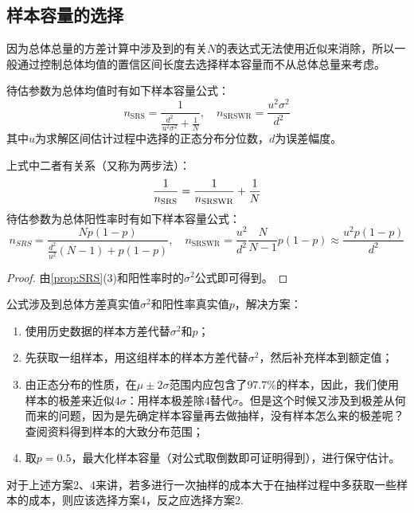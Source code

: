 \subsection{样本容量的选择}
\begin{note}
	因为总体总量的方差计算中涉及到的有关$N$的表达式无法使用近似来消除，所以一般通过控制总体均值的置信区间长度去选择样本容量而不从总体总量来考虑。
\end{note}
\begin{theorem}
	待估参数为总体均值时有如下样本容量公式：
	\begin{equation*}
		n_{\text{SRS}}=\frac{1}{\frac{d^2}{u^2\sigma^2}+\frac{1}{N}},\quad n_{\text{SRSWR}}=\frac{u^2\sigma^2}{d^2}
	\end{equation*}
	其中$u$为求解区间估计过程中选择的正态分布分位数，$d$为误差幅度。\par
	上式中二者有关系（又称为两步法）：
	\begin{equation}
		\frac{1}{n_{\text{SRS}}}=\frac{1}{n_{\text{SRSWR}}}+\frac{1}{N}\notag
	\end{equation}
	待估参数为总体阳性率时有如下样本容量公式：
	\begin{equation*}
		n_{SRS}=\frac{Np(1-p)}{\frac{d^2}{u^2}(N-1)+p(1-p)},\quad n_{\text{SRSWR}}=\frac{u^2}{d^2}\frac{N}{N-1}p(1-p)\approx\frac{u^2p(1-p)}{d^2}
	\end{equation*}
\end{theorem}
\begin{proof}
	由\cref{prop:SRS}(3)和阳性率时的$\sigma^2$公式即可得到。
\end{proof}
\begin{note}
	公式涉及到总体方差真实值$\sigma^2$和阳性率真实值$p$，解决方案：
	\begin{enumerate}
		\item 使用历史数据的样本方差代替$\sigma^2$和$p$；
		\item 先获取一组样本，用这组样本的样本方差代替$\sigma^2$，然后补充样本到额定值；
		\item 由正态分布的性质，在$\mu\pm2\sigma$范围内应包含了$97.7\%$的样本，因此，我们使用样本的极差来近似$4\sigma$：用样本极差除4替代$\sigma$。但是这个时候又涉及到极差从何而来的问题，因为是先确定样本容量再去做抽样，没有样本怎么来的极差呢？查阅资料得到样本的大致分布范围；
		\item 取$p=0.5$，最大化样本容量（对公式取倒数即可证明得到），进行保守估计。
	\end{enumerate}
	对于上述方案2、4来讲，若多进行一次抽样的成本大于在抽样过程中多获取一些样本的成本，则应该选择方案4，反之应选择方案2.
\end{note}

